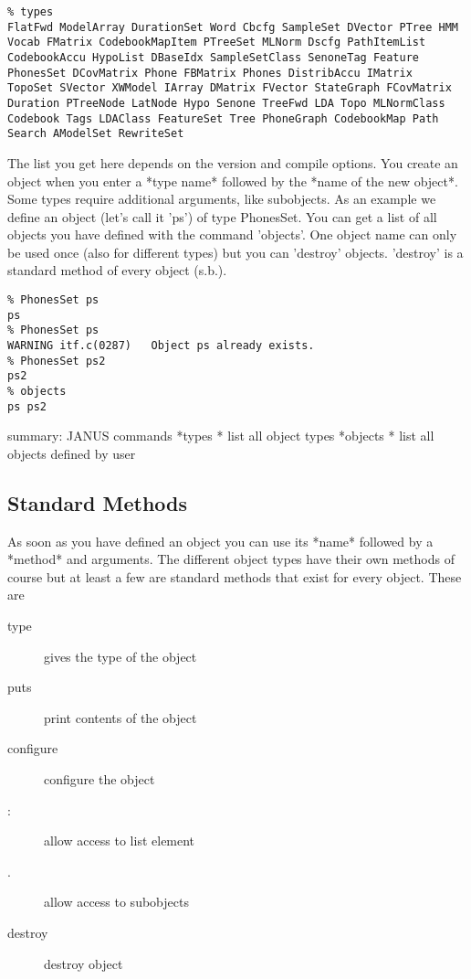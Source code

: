 \begin{verbatim}
% types
FlatFwd ModelArray DurationSet Word Cbcfg SampleSet DVector PTree HMM 
Vocab FMatrix CodebookMapItem PTreeSet MLNorm Dscfg PathItemList 
CodebookAccu HypoList DBaseIdx SampleSetClass SenoneTag Feature 
PhonesSet DCovMatrix Phone FBMatrix Phones DistribAccu IMatrix 
TopoSet SVector XWModel IArray DMatrix FVector StateGraph FCovMatrix 
Duration PTreeNode LatNode Hypo Senone TreeFwd LDA Topo MLNormClass 
Codebook Tags LDAClass FeatureSet Tree PhoneGraph CodebookMap Path 
Search AModelSet RewriteSet
\end{verbatim}

The list you get here depends on the version and compile options. You
create an object when you enter a *type name* followed by the *name of
the new object*. Some types require additional arguments, like
subobjects. As an example we define an object (let's call it 'ps') of
type PhonesSet. You can get a list of all objects you have defined with
the command 'objects'. One object name can only be used once (also for
different types) but you can 'destroy' objects. 'destroy' is a standard
method of every object (s.b.).

\begin{verbatim}
% PhonesSet ps
ps
% PhonesSet ps
WARNING itf.c(0287)   Object ps already exists.
% PhonesSet ps2 
ps2
% objects
ps ps2
\end{verbatim}

summary: JANUS commands *types * list all object types
*objects * list all objects defined by user

\subsection*{Standard Methods}

As soon as you have defined an object you can use its *name* followed by
a *method* and arguments. The different object types have their own
methods of course but at least a few are standard methods that exist for
every object. These are

\begin{description}
\item[type] gives the type of the object
\item[puts] print contents of the object
\item[configure] configure the object
\item[:] allow access to list element
\item[.] allow access to subobjects
\item[destroy] destroy object
\end{description}


